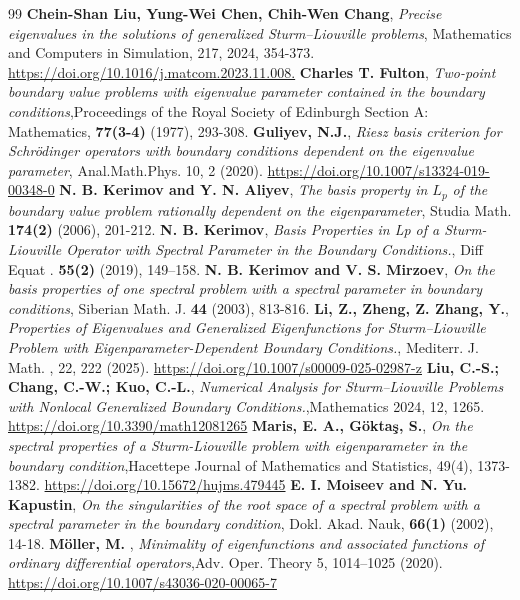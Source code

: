 \documentclass[10pt,a4paper]{amsart}
\numberwithin{equation}{section}
\begin{document}
\begin{thebibliography}{99}
 \textbf{Chein-Shan Liu, Yung-Wei Chen, Chih-Wen Chang}, \textit{Precise eigenvalues in the solutions of generalized Sturm–Liouville problems}, Mathematics and Computers in Simulation, 217, 2024, 354-373. \url{https://doi.org/10.1016/j.matcom.2023.11.008.}
 \textbf{Charles T. Fulton}, \textit{Two-point boundary value problems with eigenvalue parameter contained in the boundary conditions},Proceedings of the Royal Society of Edinburgh Section A: Mathematics, \textbf{77(3-4)} (1977), 293-308.
 \textbf{Guliyev, N.J.}, \textit{Riesz basis criterion for Schrödinger operators with boundary conditions dependent on the eigenvalue parameter}, Anal.Math.Phys. 10, 2 (2020). \url{https://doi.org/10.1007/s13324-019-00348-0}
 \textbf{N. B. Kerimov and Y. N. Aliyev}, \textit{The basis property in $L_p$ of the boundary value problem rationally dependent on the eigenparameter}, Studia Math. \textbf{174(2)} (2006), 201-212.
 \textbf{N. B. Kerimov}, \textit{Basis Properties in Lp of a Sturm-Liouville Operator with Spectral Parameter in the Boundary Conditions.}, Diff Equat . \textbf{55(2)} (2019), 149–158.
 \textbf{N. B. Kerimov and V. S. Mirzoev}, \textit{On the basis properties of one spectral problem with a spectral parameter in boundary conditions}, Siberian Math. J. \textbf{44} (2003), 813-816.
 \textbf{Li, Z., Zheng, Z. Zhang, Y.}, \textit{Properties of Eigenvalues and Generalized Eigenfunctions for Sturm–Liouville Problem with Eigenparameter-Dependent Boundary Conditions.}, Mediterr. J. Math. , 22, 222 (2025). \url{https://doi.org/10.1007/s00009-025-02987-z}
 \textbf{Liu, C.-S.; Chang, C.-W.; Kuo, C.-L.}, \textit{Numerical Analysis for Sturm–Liouville Problems with Nonlocal Generalized Boundary Conditions.},Mathematics 2024, 12, 1265. \url{https://doi.org/10.3390/math12081265}
 \textbf{Maris, E. A., Göktaş, S.}, \textit{On the spectral properties of a Sturm-Liouville problem with eigenparameter in the boundary condition},Hacettepe Journal of Mathematics and Statistics, 49(4), 1373-1382. \url{https://doi.org/10.15672/hujms.479445}
 \textbf{E. I. Moiseev and N. Yu. Kapustin}, \textit{On the singularities of the root space of a spectral problem with a spectral parameter in the boundary condition}, Dokl. Akad. Nauk, \textbf{66(1)} (2002), 14-18.
 \textbf{Möller, M. }, \textit{Minimality of eigenfunctions and associated functions of ordinary differential operators},Adv. Oper. Theory 5, 1014–1025 (2020). \url{https://doi.org/10.1007/s43036-020-00065-7}

\end{thebibliography}
\end{document}
